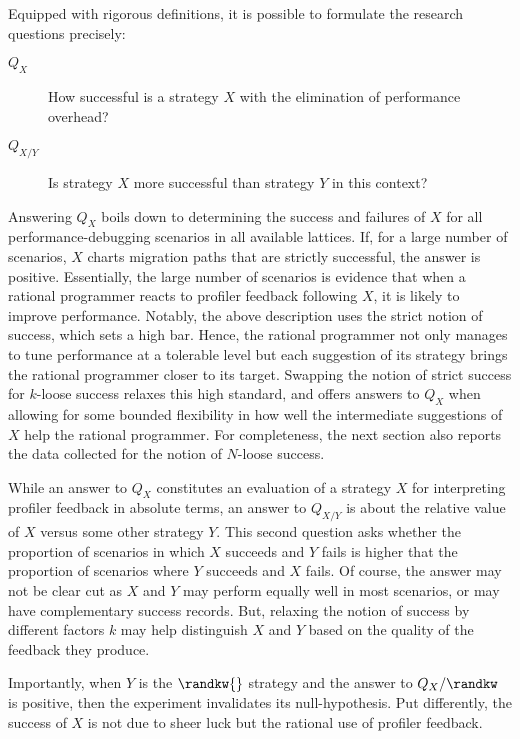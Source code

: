 
Equipped with rigorous definitions, it is possible to formulate the research
questions precisely:
\begin{description}

\item[$Q_X$] How successful is a strategy $X$ with the elimination of
  performance overhead?

\item[$Q_{X/Y}$] Is strategy $X$ more successful than strategy $Y$ in this
  context?

\end{description}

Answering $Q_X$ boils down to determining the success and failures of
$X$ for all performance-debugging
scenarios in all available lattices. If, for a large number of scenarios,
$X$ charts migration paths that are strictly successful, the answer is
positive. Essentially, the large number of scenarios is evidence that when a
rational programmer reacts to profiler feedback following $X$, it is likely to
improve performance. Notably, the above
description uses the strict notion of success, which sets a high bar.
Hence, the rational programmer not only manages to tune performance at
a tolerable level but each suggestion of its strategy brings the rational
programmer closer to its target. Swapping the notion of strict success for
$k$-loose success relaxes this high standard, and offers answers to $Q_X$ when
allowing for some bounded flexibility in how well the intermediate suggestions
of $X$ help the rational programmer. For completeness, the next section also
reports the data collected for the notion of $N$-loose success.

While an answer to $Q_X$ constitutes an evaluation of a strategy $X$ for
interpreting profiler feedback in absolute terms, an answer to $Q_{X/Y}$ is
about the relative value of $X$ versus some other strategy
$Y$. This second question asks whether the proportion of scenarios
in which $X$ succeeds and $Y$ fails is higher that
the proportion of scenarios where $Y$ succeeds and
$X$ fails. Of course, the answer may not be clear cut as $X$ and $Y$
may perform equally well in most scenarios, or may have complementary success
records. But, relaxing the notion of success by different factors $k$ may
help distinguish $X$ and $Y$ based on the quality of the feedback they produce.

Importantly, when $Y$ is the $\randkw{}$ strategy and the answer to
$Q_X/\randkw$ is positive, then the experiment invalidates its null-hypothesis.
Put differently, the success of $X$ is not due to sheer luck but the rational
use of profiler feedback.

